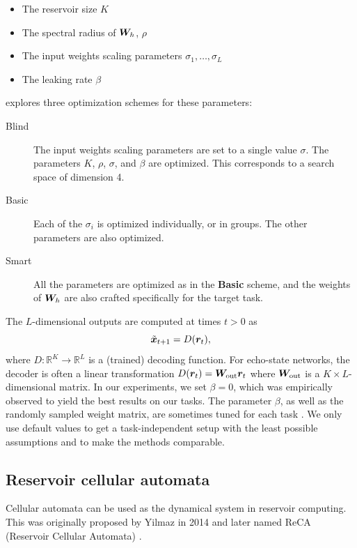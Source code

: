 \begin{itemize}
  \item The reservoir size $K$
  \item The spectral radius of ${\bm{W}}_{h}$, $\rho$
  \item The input weights scaling parameters $\sigma_{1}, \ldots, \sigma_{L}$
  \item The leaking rate $\beta$
\end{itemize}

\textcite{jaegerLongShortTermMemory2012} explores three
optimization schemes for these parameters:
\begin{description}
  \item[Blind] The input weights scaling parameters are set to a single
        value $\sigma$. The parameters $K$, $\rho$, $\sigma$, and $\beta$ are
        optimized. This corresponds to a search space of dimension 4.
  \item[Basic] Each of the $\sigma_{i}$ is optimized individually, or in
        groups. The other parameters are also optimized.
  \item[Smart] All the parameters are optimized as in the \textbf{Basic}
        scheme, and the weights of ${\bm{W}}_{h}$ are also crafted specifically for
        the target task.
\end{description}


The $L$-dimensional outputs are computed at times $t > 0$ as
\begin{equation}
  \label{eq:esn-res}
\tilde{{\bm{x}}}_{t+ 1} = D({\bm{r}}_{t}),
\end{equation}
where $D: \mathbb{R}^{K} \rightarrow \mathbb{R}^{L}$ is a (trained) decoding
function. For echo-state networks, the decoder is often a linear transformation
$D({\bm{r}}_{t}) = {\bm{W}}_{\text{out}} {\bm{r}}_{t}$ where ${\bm{W}}_{\text{out}}$ is a
$K \times L$-dimensional matrix. In our experiments, we set $\beta = 0$, which
was empirically observed to yield the best results on our tasks. The parameter
$\beta$, as well as the randomly sampled weight matrix, are sometimes tuned for
each task \parencite{jaegerLongShortTermMemory2012}. We only use default values
to get a task-independent setup with the least possible assumptions and to make
the methods comparable.

\subsection{Reservoir cellular automata\label{sec:app-ca-res}}

Cellular automata can be used as the dynamical system in reservoir computing.
This was originally proposed by Yilmaz in 2014 and later named ReCA (Reservoir
Cellular Automata) \autocite{yilmazReservoirComputingUsing2014,
  margemExperimentalStudyCellular2017}.


